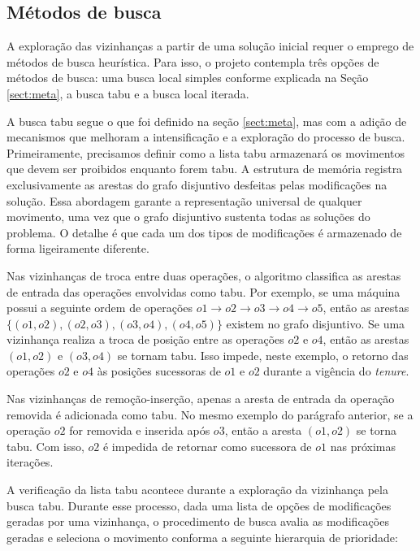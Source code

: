 \subsection{Métodos de busca}

A exploração das vizinhanças a partir de uma solução inicial requer o emprego de métodos de busca heurística. Para isso, o projeto contempla três opções de métodos de busca: uma busca local simples conforme explicada na Seção \ref{sect:meta}, a busca tabu e a busca local iterada.

A busca tabu segue o que foi definido na seção \ref{sect:meta}, mas com a adição de mecanismos que melhoram a intensificação e a exploração do processo de busca. Primeiramente, precisamos definir como a lista tabu armazenará os movimentos que devem ser proibidos enquanto forem tabu. A estrutura de memória registra exclusivamente as arestas do grafo disjuntivo desfeitas pelas modificações na solução. Essa abordagem garante a representação universal de qualquer movimento, uma vez que o grafo disjuntivo sustenta todas as soluções do problema. O detalhe é que cada um dos tipos de modificações é armazenado de forma ligeiramente diferente.

Nas vizinhanças de troca entre duas operações, o algoritmo classifica as arestas de entrada das operações envolvidas como tabu. Por exemplo, se uma máquina possui a seguinte ordem de operações $o1 \xrightarrow{} o2 \xrightarrow{} o3 \xrightarrow{} o4 \xrightarrow{} o5$, então as arestas $\{(o1,o2),(o2,o3),(o3,o4), (o4,o5)\}$ existem no grafo disjuntivo. Se uma vizinhança realiza a troca de posição entre as operações $o2$ e $o4$, então as arestas $(o1,o2)$ e $(o3,o4)$ se tornam tabu. Isso impede, neste exemplo, o retorno das operações $o2$ e $o4$ às posições sucessoras de $o1$ e $o2$ durante a vigência do \textit{tenure}. 

Nas vizinhanças de remoção-inserção, apenas a aresta de entrada da operação removida é adicionada como tabu. No mesmo exemplo do parágrafo anterior, se a operação $o2$ for removida e inserida após $o3$, então a aresta $(o1,o2)$ se torna tabu. Com isso, $o2$ é impedida de retornar como sucessora de $o1$ nas próximas iterações.

A verificação da lista tabu acontece durante a exploração da vizinhança pela busca tabu. Durante esse processo, dada uma lista de opções de modificações geradas por uma vizinhança, o procedimento de busca avalia as modificações geradas e seleciona o movimento conforma a seguinte hierarquia de prioridade:

